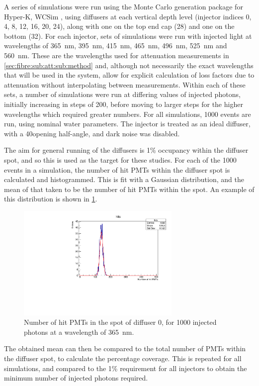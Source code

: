 \documentclass[a4paper,11pt]{article}
\begin{document}
A series of simulations were run using the Monte Carlo generation package for Hyper-K, WCSim \cite{bib:wcsim}, using diffusers at each vertical depth level (injector indices 0, 4, 8, 12, 16, 20, 24), along with one on the top end cap (28) and one on the bottom (32). For each injector, sets of simulations were run with injected light at wavelengths of 365~nm, 395~nm, 415~nm, 465~nm, 496~nm, 525~nm and 560~nm. These are the wavelengths used for attenuation measurements in \cref{sec:fibre:sub:att:sub:method} and, although not necessarily the exact wavelengths that will be used in the system, allow for explicit calculation of loss factors due to attenuation without interpolating between measurements. Within each of these sets, a number of simulations were run at differing values of injected photons, initially increasing in steps of 200, before moving to larger steps for the higher wavelengths which required greater numbers. For all simulations, 1000 events are run, using nominal water parameters. The injector is treated as an ideal diffuser, with a 40\degree opening half-angle, and dark noise was disabled.

The aim for general running of the diffusers is 1\% occupancy within the diffuser spot, and so this is used as the target for these studies. For each of the 1000 events in a simulation, the number of hit PMTs within the diffuser spot is calculated and histogrammed. This is fit with a Gaussian distribution, and the mean of that taken to be the number of hit PMTs within the spot. An example of this distribution is shown in \cref{fig:nhits_dif0_365_1000ph_plot}.
\begin{figure}[h]
\centering
\includegraphics[width=0.7\textwidth]{nhits_dif0_365_1000ph_plot.pdf}
\caption{Number of hit PMTs in the spot of diffuser 0, for 1000 injected photons at a wavelength of 365~nm.}\label{fig:nhits_dif0_365_1000ph_plot}
\end{figure}
The obtained mean can then be compared to the total number of PMTs within the diffuser spot, to calculate the percentage coverage. This is repeated for all simulations, and compared to the 1\% requirement for all injectors to obtain the minimum number of injected photons required.
\end{document}
